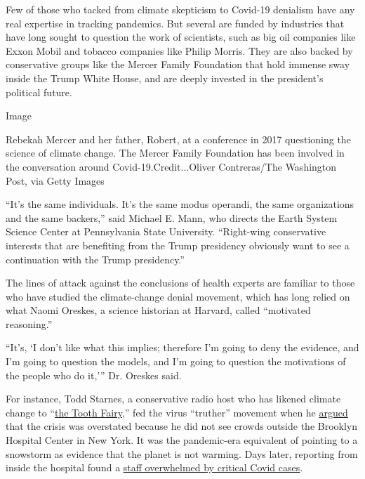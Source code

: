 Few of those who tacked from climate skepticism to Covid-19 denialism
have any real expertise in tracking pandemics. But several are funded by
industries that have long sought to question the work of scientists,
such as big oil companies like Exxon Mobil and tobacco companies like
Philip Morris. They are also backed by conservative groups like the
Mercer Family Foundation that hold immense sway inside the Trump White
House, and are deeply invested in the president's political future.

Image

Rebekah Mercer and her father, Robert, at a conference in 2017
questioning the science of climate change. The Mercer Family Foundation
has been involved in the conversation around Covid-19.Credit...Oliver
Contreras/The Washington Post, via Getty Images

``It's the same individuals. It's the same modus operandi, the same
organizations and the same backers,'' said Michael E. Mann, who directs
the Earth System Science Center at Pennsylvania State University.
``Right-wing conservative interests that are benefiting from the Trump
presidency obviously want to see a continuation with the Trump
presidency.''

The lines of attack against the conclusions of health experts are
familiar to those who have studied the climate-change denial movement,
which has long relied on what Naomi Oreskes, a science historian at
Harvard, called ``motivated reasoning.''

``It's, `I don't like what this implies; therefore I'm going to deny the
evidence, and I'm going to question the models, and I'm going to
question the motivations of the people who do it,''' Dr. Oreskes said.

For instance, Todd Starnes, a conservative radio host who has likened
climate change to
``\href{https://www.newsweek.com/robert-jeffress-greta-thunberg-rainbow-flood-climate-1461326}{the
Tooth Fairy},'' fed the virus ``truther'' movement when he
\href{https://www.nbcnews.com/tech/social-media/coronavirus-deniers-take-aim-hospitals-pandemic-grows-n1172336}{argued}
that the crisis was overstated because he did not see crowds outside the
Brooklyn Hospital Center in New York. It was the pandemic-era equivalent
of pointing to a snowstorm as evidence that the planet is not warming.
Days later, reporting from inside the hospital found a
\href{https://www.nytimes3xbfgragh.onion/2020/03/26/nyregion/coronavirus-brooklyn-hospital.html}{staff
overwhelmed by critical Covid cases}.

